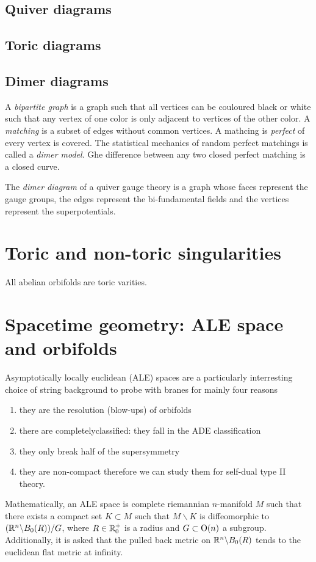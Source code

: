 \documentclass[a4paper,10pt]{article}
\begin{document}
    \subsection{Quiver diagrams}

    \subsection{Toric diagrams}

    \subsection{Dimer diagrams}

        A \emph{bipartite graph} is a graph such that all vertices can be couloured black or white such that any vertex of one color is only adjacent to vertices of the other color. A \emph{matching} is a subset of edges without common vertices. A mathcing is \emph{perfect} of every vertex is covered. The statistical mechanics of random perfect matchings is called a \emph{dimer model}. Ghe difference between any two closed perfect matching is a closed curve.

        The \emph{dimer diagram} of a quiver gauge theory is a graph whose faces represent the gauge groups, the edges represent the bi-fundamental fields and the vertices represent the superpotentials.

\section{Toric and non-toric singularities}

    All abelian orbifolds are toric varities.

\section{Spacetime geometry: ALE space and orbifolds}\label{app:spacetimegeom}

    Asymptotically locally euclidean (ALE) spaces are a particularly interresting choice of string background to probe with branes for mainly four reasons
    \begin{enumerate}[label=(\roman*)]
        \item they are the resolution (blow-ups) of orbifolds
        \item there are completelyclassified: they fall in the ADE classification
        \item they only break half of the supersymmetry
        \item they are non-compact therefore we can study them for self-dual type II theory\marker.
    \end{enumerate}
    Mathematically, an ALE space is complete riemannian $n$-manifold $M$ such that there exists a compact set $K\subset M$ such that $M\backslash K$ is diffeomorphic to $(\mathbb{R}^n\backslash B_0(R))/G$, where $R\in\mathbb{R}^+_0$ is a radius and $G\subset\text{O}(n)$ a subgroup. Additionally, it is asked that the pulled back metric on $\mathbb{R}^n\backslash B_0(R)$ tends to the euclidean flat metric at infinity.
\end{document}
